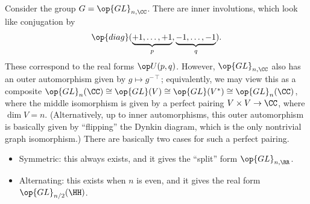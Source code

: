 \documentclass[../notes.tex]{subfiles}
\begin{document}
\begin{example}
	Consider the group $G=\op{GL}_{n,\CC}$. There are inner involutions, which look like conjugation by
	\[\op{diag}(\underbrace{+1,\ldots,+1}_p,\underbrace{-1,\ldots,-1}_q).\]
	These correspond to the real forms $\op U(p,q)$. However, $\op{GL}_{n,\CC}$ also has an outer automorphism given by $g\mapsto g^{-\intercal}$; equivalently, we may view this as a composite $\op{GL}_n(\CC)\cong\op{GL}(V)\cong\op{GL}(V^*)\cong\op{GL}_n(\CC)$, where the middle isomorphism is given by a perfect pairing $V\times V\to\CC$, where $\dim V=n$. (Alternatively, up to inner automorphisms, this outer automorphism is basically given by ``flipping'' the Dynkin diagram, which is the only nontrivial graph isomorphism.) There are basically two cases for such a perfect pairing.
	\begin{itemize}
		\item Symmetric: this always exists, and it gives the ``split'' form $\op{GL}_{n,\RR}$.
		\item Alternating: this exists when $n$ is even, and it gives the real form $\op{GL}_{n/2}(\HH)$.
	\end{itemize}
\end{example}
\end{document}
